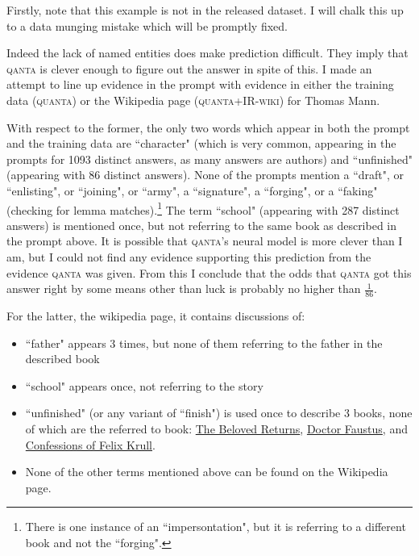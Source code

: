 \documentclass[12pt]{article}
\begin{document}
Firstly, note that this example is not in the released dataset.
I will chalk this up to a data munging mistake which will be promptly fixed.

Indeed the lack of named entities does make prediction difficult.
They imply that \textsc{qanta} is clever enough to figure out the
answer in spite of this.
I made an attempt to line up evidence in the prompt with evidence
in either the training data (\textsc{quanta}) or the Wikipedia page (\textsc{quanta+IR-wiki}) for Thomas Mann.

With respect to the former, the only two words which appear in both the
prompt and the training data are ``character" (which is very common, appearing
in the prompts for 1093 distinct answers, as many answers are authors)
and ``unfinished" (appearing with 86 distinct answers).
None of the prompts mention a ``draft", or ``enlisting", or ``joining", or ``army",
a ``signature", a ``forging", or a ``faking" (checking for lemma matches).\footnote{There is one
instance of an ``impersontation", but it is referring to a different book and not the ``forging".}
The term ``school" (appearing with 287 distinct answers) is mentioned once, but not referring to the
same book as described in the prompt above.
It is possible that \textsc{qanta}'s neural model is more clever than I am, but I could not
find any evidence supporting this prediction from the evidence \textsc{qanta} was given.
From this I conclude that the odds that \textsc{qanta} got this answer right by some means
other than luck is probably no higher than $\frac{1}{86}$.


For the latter, the wikipedia page, it contains discussions of:
\begin{itemize}
\item ``father" appears 3 times, but none of them referring to the father in the described book
\item ``school" appears once, not referring to the story
\item ``unfinished" (or any variant of ``finish") is used once to describe 3 books, none of which are the referred to book:
  \href{https://en.wikipedia.org/wiki/Lotte\_in\_Weimar:\_The\_Beloved\_Returns}{The Beloved Returns},
  \href{https://en.wikipedia.org/wiki/Doctor\_Faustus\_(novel)}{Doctor Faustus},
  and \href{https://en.wikipedia.org/wiki/Confessions\_of\_Felix\_Krull}{Confessions of Felix Krull}.
\item None of the other terms mentioned above can be found on the Wikipedia page.
\end{itemize}
\end{document}
